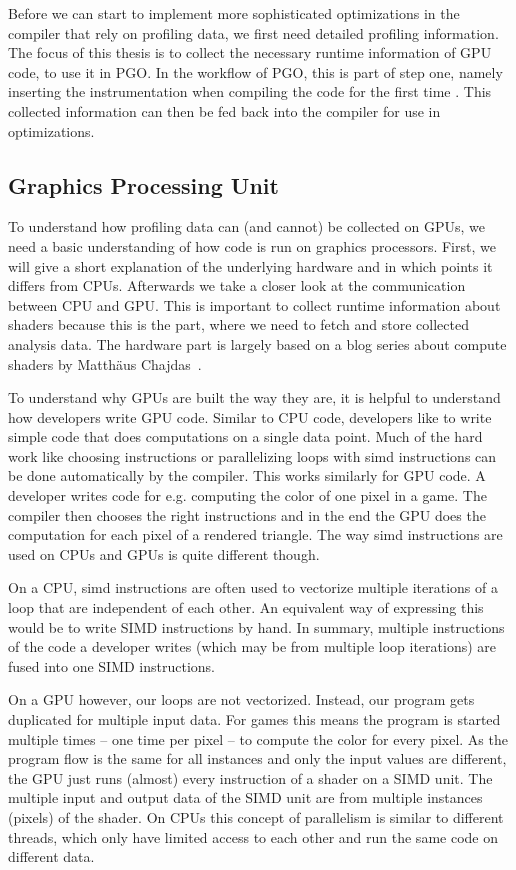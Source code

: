 Before we can start to implement more sophisticated optimizations in the compiler that rely on profiling data, we first need detailed profiling information. The focus of this thesis is to collect the necessary runtime information of GPU code, to use it in PGO. In the workflow of PGO, this is part of step one, namely inserting the instrumentation when compiling the code for the first time%
. This collected information can then be fed back into the compiler for use in optimizations.

\subsection{Graphics Processing Unit}
To understand how profiling data can (and cannot) be collected on GPUs, we need a basic understanding of how code is run on graphics processors. First, we will give a short explanation of the underlying hardware and in which points it differs from CPUs. Afterwards we take a closer look at the communication between CPU and GPU. This is important to collect runtime information about shaders because this is the part, where we need to fetch and store collected analysis data. The hardware part is largely based on a blog series about compute shaders by Matthäus Chajdas~\cite{Chajdas2018}.

To understand why GPUs are built the way they are, it is helpful to understand how developers write GPU code. Similar to CPU code, developers like to write simple code that does computations on a single data point. Much of the hard work like choosing instructions or parallelizing loops with \gls{simd} instructions can be done automatically by the compiler. This works similarly for GPU code. A developer writes code for e.g. computing the color of one pixel in a game. The compiler then chooses the right instructions and in the end the GPU does the computation for each pixel of a rendered triangle. The way \gls{simd} instructions are used on CPUs and GPUs is quite different though.

On a CPU, \gls{simd} instructions are often used to vectorize multiple iterations of a loop that are independent of each other. An equivalent way of expressing this would be to write SIMD instructions by hand. In summary, multiple instructions of the code a developer writes (which may be from multiple loop iterations) are fused into one SIMD instructions.

On a GPU however, our loops are not vectorized. Instead, our program gets duplicated for multiple input data. For games this means the program is started multiple times -- one time per pixel -- to compute the color for every pixel. As the program flow is the same for all instances and only the input values are different, the GPU just runs (almost) every instruction of a shader on a SIMD unit. The multiple input and output data of the SIMD unit are from multiple instances (pixels) of the shader. On CPUs this concept of parallelism is similar to different threads, which only have limited access to each other and run the same code on different data.

